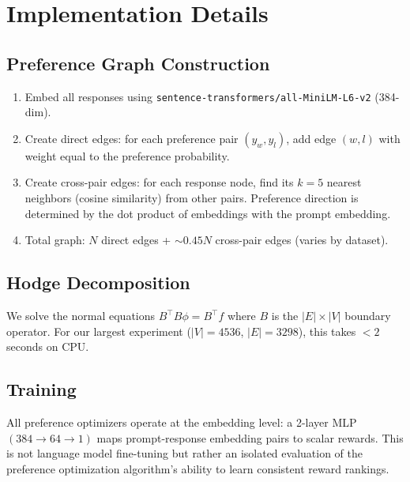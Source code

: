\documentclass{article}
\begin{document}
\section{Implementation Details}
\label{app:implementation}

\subsection{Preference Graph Construction}

\begin{enumerate}
    \item Embed all responses using \texttt{sentence-transformers/all-MiniLM-L6-v2} (384-dim).
    \item Create direct edges: for each preference pair $(y_w, y_l)$, add edge $(w, l)$ with weight equal to the preference probability.
    \item Create cross-pair edges: for each response node, find its $k=5$ nearest neighbors (cosine similarity) from other pairs. Preference direction is determined by the dot product of embeddings with the prompt embedding.
    \item Total graph: $N$ direct edges + $\sim 0.45N$ cross-pair edges (varies by dataset).
\end{enumerate}

\subsection{Hodge Decomposition}

We solve the normal equations $B^\top B \phi = B^\top f$ where $B$ is the $|E| \times |V|$ boundary operator. For our largest experiment ($|V| = 4536$, $|E| = 3298$), this takes $< 2$ seconds on CPU.

\subsection{Training}

All preference optimizers operate at the embedding level: a 2-layer MLP $(384 \to 64 \to 1)$ maps prompt-response embedding pairs to scalar rewards. This is not language model fine-tuning but rather an isolated evaluation of the preference optimization algorithm's ability to learn consistent reward rankings.
\end{document}
